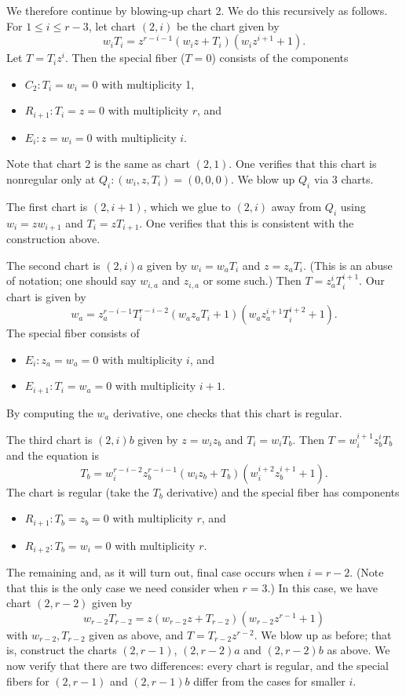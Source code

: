\documentclass{article}
\theoremstyle{plain}
\theoremstyle{definition}
\theoremstyle{remark}
\begin{document}
We therefore continue by blowing-up chart 2. We do this recursively as follows. For $1 \leq i \leq r-3$, let chart $(2,i)$ be the chart given by
  \[
  w_i T_i = z^{r-i-1} (w_i z + T_i) (w_i z^{i+1} + 1).
  \]
  Let $T = T_i z^i$. Then the special fiber ($T = 0$) consists of the components
  \begin{itemize}
      \item $C_2: T_i = w_i = 0$ with multiplicity 1,
      \item $R_{i+1}: T_i = z = 0$ with multiplicity $r$, and
      \item $E_i: z = w_i = 0$ with multiplicity $i$.
  \end{itemize}
  Note that chart 2 is the same as chart $(2,1)$. One verifies that this chart is nonregular only at $Q_i: (w_i, z, T_i) = (0, 0, 0)$. We blow up $Q_i$ via 3 charts.

  The first chart is $(2,i+1)$, which we glue to $(2,i)$ away from $Q_i$ using $w_i = z w_{i+1}$ and $T_i = z T_{i+1}$. One verifies that this is consistent with the construction above.

  The second chart is $(2,i)a$ given by $w_i = w_a T_i$ and $z = z_a T_i$. (This is an abuse of notation; one should say $w_{i,a}$ and $z_{i,a}$ or some such.) Then $T = z_a^i T_i^{i+1}$. Our chart is given by
  \[
  w_a = z_a^{r-i-1} T_i^{r-i-2} (w_a z_a T_i + 1) (w_a z_a^{i+1} T_i^{i+2} + 1).
  \]
  The special fiber consists of
  \begin{itemize}
      \item $E_i: z_a = w_a = 0$ with multiplicity $i$, and
      \item $E_{i+1}: T_i = w_a = 0$ with multiplicity $i+1$.
  \end{itemize}
  By computing the $w_a$ derivative, one checks that this chart is regular.

  The third chart is $(2,i)b$ given by $z = w_i z_b$ and $T_i = w_i T_b$. Then $T = w_i^{i+1} z_b^i T_b$ and the equation is
  \[
  T_b = w_i^{r-i-2} z_b^{r-i-1} (w_i z_b + T_b) (w_i^{i+2} z_b^{i+1} + 1).
  \]
  The chart is regular (take the $T_b$ derivative) and the special fiber has components
  \begin{itemize}
      \item $R_{i+1}: T_b = z_b = 0$ with multiplicity $r$, and
      \item $R_{i+2}: T_b = w_i = 0$ with multiplicity $r$.
  \end{itemize}

  The remaining and, as it will turn out, final case occurs when $i = r - 2$. (Note that this is the only case we need consider when $r = 3$.) In this case, we have chart $(2, r-2)$ given by
  \[
  w_{r-2} T_{r-2} = z (w_{r-2} z + T_{r-2}) (w_{r-2} z^{r-1} + 1)
  \]
  with $w_{r-2}, T_{r-2}$ given as above, and $T = T_{r-2} z^{r-2}$. We blow up as before; that is, construct the charts $(2, r-1)$, $(2, r-2)a$ and $(2, r-2)b$ as above. We now verify that there are two differences: every chart is regular, and the special fibers for $(2, r-1)$ and $(2,r-1)b$ differ from the cases for smaller $i$.
\end{document}
